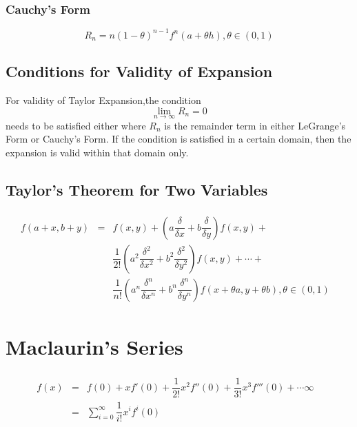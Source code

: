 \subsubsection{Cauchy's Form}
\begin{equation}
	R_n=n(1-\theta)^{n-1}f^n(a+\theta h), \theta \in (0,1)
\end{equation}

\subsection{Conditions for Validity of Expansion}
For validity of Taylor Expansion,the condition
\begin{equation}
	\lim_{n\to\infty} R_n=0
\end{equation}
needs to be satisfied either where $R_n$ is the remainder term in either LeGrange's Form or Cauchy's Form. If the condition is satisfied in a certain domain, then the expansion is valid within that domain only.

\subsection{Taylor's Theorem for Two Variables}
\begin{equation}
	\begin{aligned}
		\begin{split}
			f(a+x,b+y)& = &f(x,y)+\left( a\dfrac{\delta}{\delta x}+b\dfrac{\delta}{\delta y}\right)f (x,y)+&\\
			& &\dfrac{1}{2!}\left( a^2\dfrac{\delta^2}{\delta x^2}+b^2\dfrac{\delta^2}{\delta y^2}\right) f(x,y)+\cdots+&\\
			& &\dfrac{1}{n!}\left( a^n\dfrac{\delta^n}{\delta x^n}+b^n\dfrac{\delta^n}{\delta y^n}\right) f(x+\theta a,y+\theta b), \theta \in (0,1)
		\end{split}
	\end{aligned}
\end{equation}

\section{Maclaurin's Series}
\begin{equation}
	\begin{aligned}
		\begin{split}
			f(x)&=&f(0)+xf'(0)+\dfrac{1}{2!}x^2f''(0)+\dfrac{1}{3!}x^3f'''(0)+\cdots\infty&\\
			&=& \sum_{i=0}^\infty \dfrac{1}{i!} x^i f^i(0)
		\end{split}
	\end{aligned}
\end{equation}

